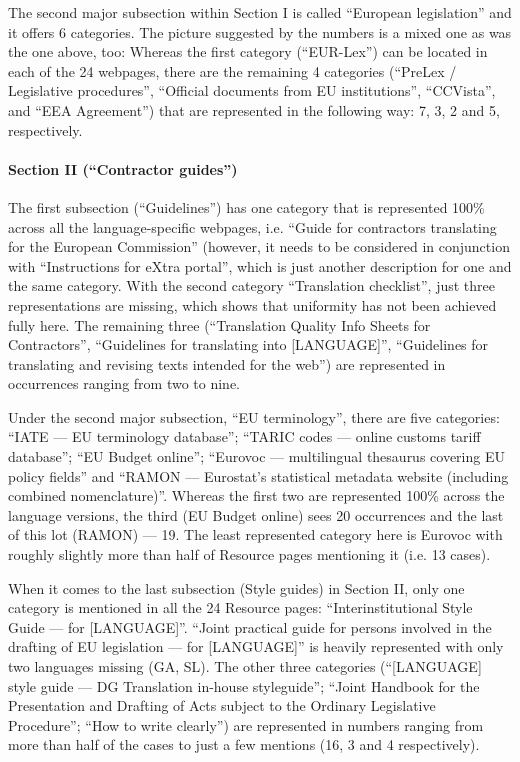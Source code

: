 \documentclass[output=paper]{langsci/langscibook}
\begin{document}
The second major subsection within Section I is called “European legislation” and it offers 6 categories. The picture suggested by the numbers is a mixed one as was the one above, too: Whereas the first category (“EUR-Lex”) can be located in each of the 24 webpages, there are the remaining 4 categories (“PreLex / Legislative procedures”, “Official documents from EU institutions”, “CCVista”, and “EEA Agreement”) that are represented in the following way: 7, 3, 2 and 5, respectively. 

\paragraph*{Section II (“Contractor guides”)}

The first subsection (“Guidelines”) has one category that is represented 100\% across all the language-specific webpages, i.e. “Guide for contractors translating for the European Commission” (however, it needs to be considered in conjunction with “Instructions for eXtra portal”, which is just another description for one and the same category. With the second category “Translation checklist”, just three representations are missing, which shows that uniformity has not been achieved fully here. The remaining three (“Translation Quality Info Sheets for Contractors”, “Guidelines for translating into [LANGUAGE]”, “Guidelines for translating and revising texts intended for the web”) are represented in occurrences ranging from two to nine.

Under the second major subsection, “EU terminology”, there are five categories: “IATE — EU terminology database”; “TARIC codes — online customs tariff database”; “EU Budget online”; “Eurovoc — multilingual thesaurus covering EU policy fields” and “RAMON — Eurostat’s statistical metadata website (including combined nomenclature)”. Whereas the first two are represented 100\% across the language versions, the third (EU Budget online) sees 20 occurrences and the last of this lot (RAMON) — 19. The least represented category here is Eurovoc with roughly slightly more than half of Resource pages mentioning it (i.e. 13 cases).

When it comes to the last subsection (Style guides) in Section II, only one category is mentioned in all the 24 Resource pages: “Interinstitutional Style Guide — for [LANGUAGE]”. “Joint practical guide for persons involved in the drafting of EU legislation — for [LANGUAGE]” is heavily represented with only two languages missing (GA, SL). The other three categories (“[LANGUAGE] style guide — DG Translation in-house styleguide”; “Joint Handbook for the Presentation and Drafting of Acts subject to the Ordinary Legislative Procedure”; “How to write clearly”) are represented in numbers ranging from more than half of the cases to just a few mentions (16, 3 and 4 respectively).
\end{document}
